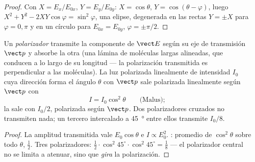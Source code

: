 \begin{proof}
Con $X = E_x/E_{0x}$, $Y = E_y/E_{0y}$: $X = \cos\theta$, $Y = \cos(\theta - \varphi)$, luego
$X^2 + Y^2 - 2XY\cos\varphi = \sin^2\varphi$, una elipse, degenerada en las
rectas $Y = \pm X$ para $\varphi = 0, \pi$ y en un círculo para $E_{0x} = E_{0y}$,
$\varphi = \pm\pi/2$.
\end{proof}

\begin{proposition}\label{prop:b2:plane-waves-polarization:malus}
Un \emph{polarizador} transmite la componente de $\vect E$ según su eje de
transmisión $\vect p$ y absorbe la otra (una lámina de moléculas largas
alineadas, que conducen a lo largo de su longitud --- la polarización
transmitida es perpendicular a las moléculas). La luz polarizada
linealmente de intensidad $I_0$ cuya dirección forma el ángulo $\theta$ con
$\vect p$ sale polarizada linealmente según $\vect p$ con
\[
I = I_0\cos^2\theta \qquad\text{(Malus)} ;
\]
la  sale con $I_0/2$, polarizada según $\vect p$. Dos
polarizadores cruzados no transmiten nada; un tercero intercalado a
\qty{45}{\degree} entre ellos transmite $I_0/8$.
\end{proposition}

\begin{proof}
La amplitud transmitida vale $E_0\cos\theta$ e $I \propto E_0^2$. :
promedio de $\cos^2\theta$ sobre todo $\theta$, $\tfrac12$. Tres polarizadores:
$\tfrac12\cdot\cos^2 45^\circ\cdot\cos^2 45^\circ = \tfrac18$ --- el polarizador
central no se limita a atenuar, sino que \emph{gira} la polarización.
\end{proof}

